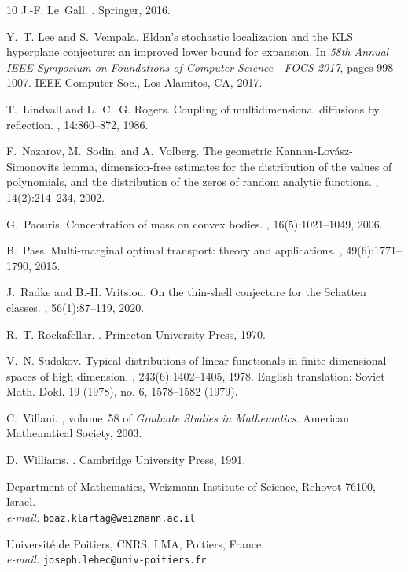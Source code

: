 \documentclass[12pt,a4paper]{article}
\theoremstyle{definition}
\begin{document}
\begin{thebibliography}{10}
J.-F. Le~Gall.
.
\newblock Springer, 2016.

Y.~T. Lee and S.~Vempala.
\newblock Eldan's stochastic localization and the {KLS} hyperplane conjecture:
  an improved lower bound for expansion.
\newblock In {\em 58th {A}nnual {IEEE} {S}ymposium on {F}oundations of
  {C}omputer {S}cience---{FOCS} 2017}, pages 998--1007. IEEE Computer Soc., Los
  Alamitos, CA, 2017.

T.~Lindvall and L.~C.~G. Rogers.
\newblock Coupling of multidimensional diffusions by reflection.
, 14:860--872, 1986.

F.~Nazarov, M.~Sodin, and A.~Volberg.
\newblock The geometric {K}annan-{L}ov\'asz-{S}imonovits lemma, dimension-free
  estimates for the distribution of the values of polynomials, and the
  distribution of the zeros of random analytic functions.
, 14(2):214--234, 2002.

G.~Paouris.
\newblock Concentration of mass on convex bodies.
, 16(5):1021--1049, 2006.

B.~Pass.
\newblock Multi-marginal optimal transport: theory and applications.
, 49(6):1771--1790, 2015.

J.~Radke and B.-H. Vritsiou.
\newblock On the thin-shell conjecture for the {S}chatten classes.
, 56(1):87--119,
  2020.

R.~T. Rockafellar.
.
\newblock Princeton University Press, 1970.

V.~N. Sudakov.
\newblock Typical distributions of linear functionals in finite-dimensional
  spaces of high dimension.
, 243(6):1402--1405, 1978.
\newblock English translation: Soviet Math. Dokl. 19 (1978), no. 6, 1578–1582
  (1979).

C.~Villani.
, volume~58 of {\em Graduate
  Studies in Mathematics}.
\newblock American Mathematical Society, 2003.

D.~Williams.
.
\newblock Cambridge University Press, 1991.

\end{thebibliography}


\medskip
\noindent Department of Mathematics,
Weizmann Institute of Science,
Rehovot 76100, Israel. \\
{\it e-mail:} \verb"boaz.klartag@weizmann.ac.il"


\medskip
\noindent Universit\'e de Poitiers, CNRS, LMA, Poitiers, France. \\
{\it e-mail:} \verb"joseph.lehec@univ-poitiers.fr"
\end{document}

